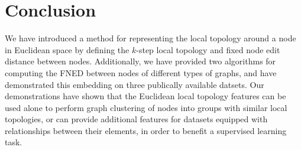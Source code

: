 \documentclass[10pt,twocolumn,fleqn]{article}
\begin{document}
\section{Conclusion}
\label{sec:conclusion}

We have introduced a method for representing the local topology around a node in Euclidean space by defining the $k$-step local topology and fixed node edit distance between nodes. Additionally, we have provided two algorithms for computing the FNED between nodes of different types of graphs, and have demonstrated this embedding on three publically available datsets. Our demonstrations have shown that the Euclidean local topology features can be used alone to perform graph clustering of nodes into groups with similar local topologies, or can provide additional features for datasets equipped with relationships between their elements, in order to benefit a supervised learning task. 


\begin{small}

 
\end{small}
\end{document}
